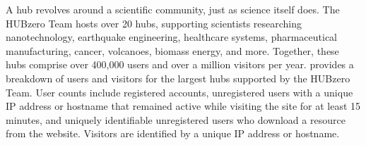 A hub revolves around a scientific community, just as science itself does. The
HUBzero Team hosts over 20 hubs, supporting scientists researching
nanotechnology, earthquake engineering, healthcare systems, pharmaceutical
manufacturing, cancer, volcanoes, biomass energy, and more. Together, these
hubs comprise over 400,000 users and over a million visitors per year.
 provides a breakdown of users and visitors for the
largest hubs supported by the HUBzero Team. User counts include registered
accounts, unregistered users with a unique IP address or hostname that remained
active while visiting the site for at least 15 minutes, and uniquely
identifiable unregistered users who download a resource from the website.
Visitors are identified by a unique IP address or hostname.

%
%
%
%
%
%
%
%
%
%
%
%
%
%
%
%
%
%
%
%
%
%

